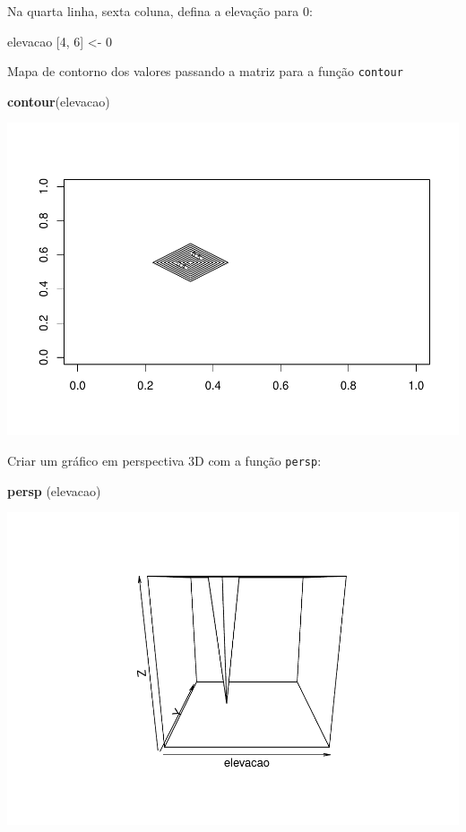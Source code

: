\documentclass[
]{book}
\newenvironment{Shaded}{\begin{snugshade}}{\end{snugshade}}
\newcommand{\DecValTok}[1]{\textcolor[rgb]{0.00,0.00,0.81}{#1}}
\newcommand{\KeywordTok}[1]{\textcolor[rgb]{0.13,0.29,0.53}{\textbf{#1}}}
\newcommand{\NormalTok}[1]{#1}
\newcommand{\StringTok}[1]{\textcolor[rgb]{0.31,0.60,0.02}{#1}}
\begin{document}
Na quarta linha, sexta coluna, defina a elevação para 0:

\begin{Shaded}
\begin{Highlighting}[]
\NormalTok{elevacao [}\DecValTok{4}\NormalTok{, }\DecValTok{6}\NormalTok{] <-}\StringTok{ }\DecValTok{0}
\end{Highlighting}
\end{Shaded}

Mapa de contorno dos valores passando a matriz para a função \texttt{contour}

\begin{Shaded}
\begin{Highlighting}[]
\KeywordTok{contour}\NormalTok{(elevacao)}
\end{Highlighting}
\end{Shaded}

\includegraphics{TudodoR_files/figure-latex/unnamed-chunk-71-1.pdf}

Criar um gráfico em perspectiva 3D com a função \texttt{persp}:

\begin{Shaded}
\begin{Highlighting}[]
\KeywordTok{persp}\NormalTok{ (elevacao)}
\end{Highlighting}
\end{Shaded}

\includegraphics{TudodoR_files/figure-latex/unnamed-chunk-72-1.pdf}
\end{document}
